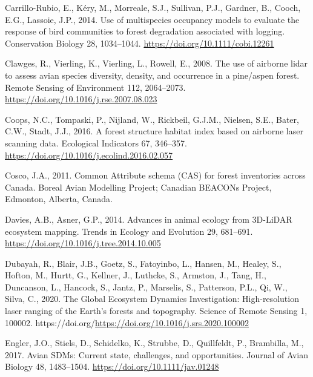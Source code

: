 \documentclass[
]{article}
\newlength{\cslhangindent}
\newlength{\cslentryspacingunit} %
\newenvironment{CSLReferences}[2] %
 {%
  \setlength{\parindent}{0pt}
  \ifodd #1
  \let\oldpar\par
  \def\par{\hangindent=\cslhangindent\oldpar}
  \fi
  \setlength{\parskip}{#2\cslentryspacingunit}
 }%
 {}
\begin{document}
\begin{CSLReferences}{1}{0}
\leavevmode{}%
Carrillo-Rubio, E., Kéry, M., Morreale, S.J., Sullivan, P.J., Gardner, B., Cooch, E.G., Lassoie, J.P., 2014. Use of multispecies occupancy models to evaluate the response of bird communities to forest degradation associated with logging. Conservation Biology 28, 1034--1044. \url{https://doi.org/10.1111/cobi.12261}

\leavevmode{}%
Clawges, R., Vierling, K., Vierling, L., Rowell, E., 2008. The use of airborne lidar to assess avian species diversity, density, and occurrence in a pine/aspen forest. Remote Sensing of Environment 112, 2064--2073. \url{https://doi.org/10.1016/j.rse.2007.08.023}

\leavevmode{}%
Coops, N.C., Tompaski, P., Nijland, W., Rickbeil, G.J.M., Nielsen, S.E., Bater, C.W., Stadt, J.J., 2016. A forest structure habitat index based on airborne laser scanning data. Ecological Indicators 67, 346--357. \url{https://doi.org/10.1016/j.ecolind.2016.02.057}

\leavevmode{}%
Cosco, J.A., 2011. Common {Attribute} schema ({CAS}) for forest inventories across {Canada}. Boreal Avian Modelling Project; Canadian BEACONs Project, Edmonton, Alberta, Canada.

\leavevmode{}%
Davies, A.B., Asner, G.P., 2014. Advances in animal ecology from {3D}-{LiDAR} ecosystem mapping. Trends in Ecology and Evolution 29, 681--691. \url{https://doi.org/10.1016/j.tree.2014.10.005}

\leavevmode{}%
Dubayah, R., Blair, J.B., Goetz, S., Fatoyinbo, L., Hansen, M., Healey, S., Hofton, M., Hurtt, G., Kellner, J., Luthcke, S., Armston, J., Tang, H., Duncanson, L., Hancock, S., Jantz, P., Marselis, S., Patterson, P.L., Qi, W., Silva, C., 2020. The {Global} {Ecosystem} {Dynamics} {Investigation}: {High}-resolution laser ranging of the {Earth}'s forests and topography. Science of Remote Sensing 1, 100002. https://doi.org/\url{https://doi.org/10.1016/j.srs.2020.100002}

\leavevmode{}%
Engler, J.O., Stiels, D., Schidelko, K., Strubbe, D., Quillfeldt, P., Brambilla, M., 2017. Avian {SDMs}: Current state, challenges, and opportunities. Journal of Avian Biology 48, 1483--1504. \url{https://doi.org/10.1111/jav.01248}


\end{CSLReferences}
\end{document}
